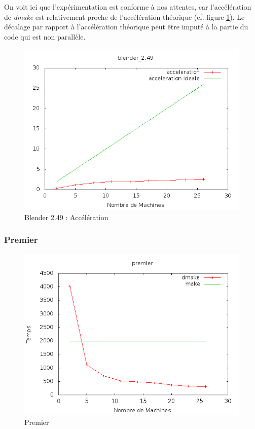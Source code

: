 \documentclass[a4paper,12pt,twoside]{article}
\begin{document}
On voit ici que l'expérimentation est conforme à nos attentes, car
l'accélération de \emph{dmake} est relativement proche de l'accélération
théorique (cf. figure \ref{fig:blender249acc}). Le décalage par rapport à l'accélération théorique peut
être imputé à la partie du code qui est non parallèle. 

\begin{figure}[H]
  \centering
  \includegraphics[scale=0.5]{acceleration_blender_2.49.png}
  \caption{Blender 2.49 : Accélération}
  \label{fig:blender249acc}
\end{figure}


\subsubsection{Premier}


\begin{figure}[H]
  \centering
  \includegraphics[scale=0.5]{graph_premier.png}
  \caption{Premier}
  \label{fig:premier}
\end{figure}
\end{document}
